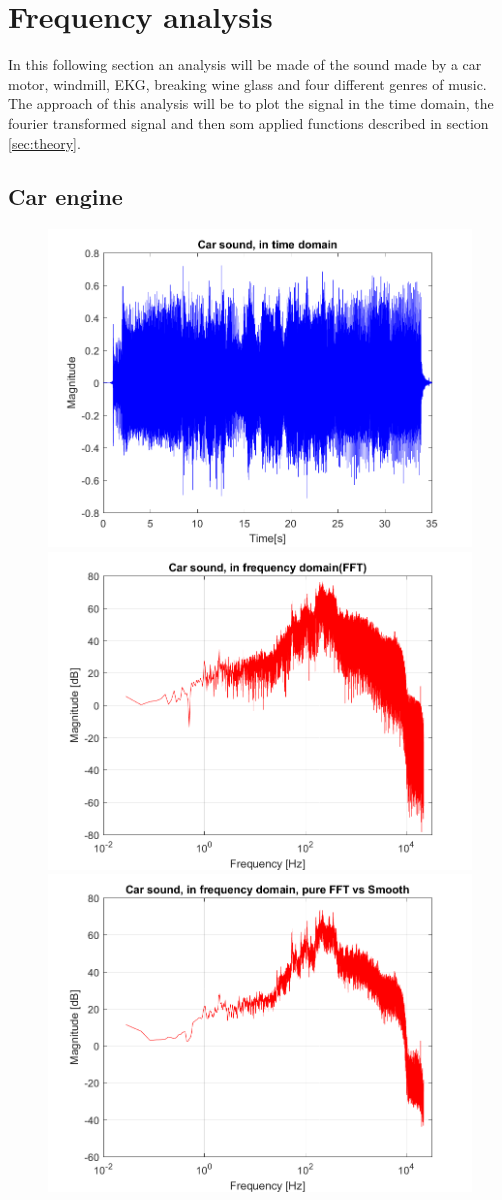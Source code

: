 \section{Frequency analysis}
\label{sec:analysis}

In this following section an analysis will be made of the sound made by a car motor, windmill, EKG, breaking wine glass and four different genres of music. 
The approach of this analysis will be to plot the signal in the time domain, the fourier transformed signal and then som applied functions described in section \ref{sec:theory}.


\subsection{Car engine}
\begin{figure}[htb]
	\centering
	{\includegraphics[width=0.45\linewidth]{code/Car_figure1.png}}
	{\includegraphics[width=0.45\linewidth]{code/Car_figure2.png}}
	{\includegraphics[width=0.45\linewidth]{code/Car_figure3.png}}

\end{figure}
